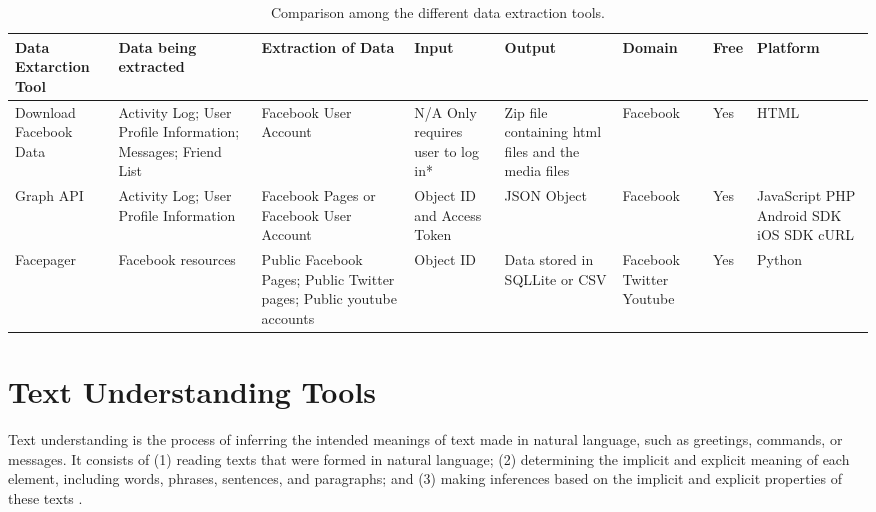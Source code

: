 \clearpage
\begin{sidewaystable}[ph!]   %
\centering
\caption{Comparison among the different data extraction tools.} \vspace{0.25em}
\begin{tabular}{|p{1in}|p{4cm}|p{3cm}|p{3cm}|p{3cm}|p{2cm}|p{1cm}|p{2cm}|} \hline
\centering Data Extarction Tool & Data being extracted & Extraction of Data & Input & Output & Domain & Free & Platform \\ \hline
Download Facebook Data  & Activity Log; \newline User Profile Information; \newline Messages; \newline Friend List & Facebook User Account & N/A \newline *Only requires user to log in*  &  Zip file containing html files and the media files &  Facebook & Yes & HTML\\ \hline
Graph API & Activity Log; \newline User Profile Information  & Facebook Pages or Facebook User Account & Object ID and Access Token & JSON Object & Facebook & Yes & JavaScript \newline PHP \newline Android SDK \newline iOS SDK \newline cURL \\ \hline
Facepager & Facebook resources
 & Public Facebook Pages; \newline Public Twitter pages; \newline Public youtube accounts & Object ID & Data stored in SQLLite or CSV & Facebook \newline Twitter \newline Youtube & Yes & Python\\ \hline
\end{tabular}
\label{tab:DataExtractionTool}
\end{sidewaystable}
\clearpage

\section{Text Understanding Tools}
Text understanding is the process of inferring the intended meanings of text made in natural language, such as greetings, commands, or messages. It consists of (1) reading texts that were formed in natural language; (2) determining the implicit and explicit meaning of each element, including words, phrases, sentences, and paragraphs; and (3) making inferences based on the implicit and explicit properties of these texts \cite{ZhangLecun2015}.

